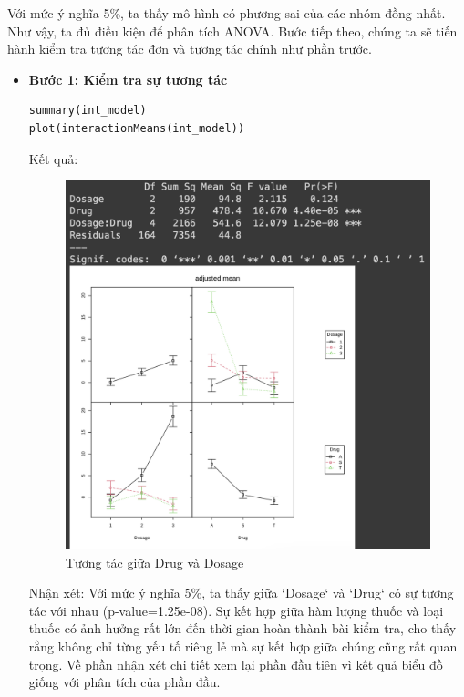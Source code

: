 Với mức ý nghĩa 5\%, ta thấy mô hình có phương sai của các nhóm đồng nhất. Như vậy, ta đủ điều kiện để phân tích ANOVA. Bước tiếp theo, chúng ta sẽ tiến hành kiểm tra tương tác đơn và tương tác chính như phần trước.

\begin{itemize}
    \item \textbf{Bước 1: Kiểm tra sự tương tác }
    \begin{lstlisting}
summary(int_model)
plot(interactionMeans(int_model))
    \end{lstlisting}

Kết quả:
\begin{figure}[H]
    \centering
    \includegraphics[width=0.7\linewidth]{part01_figures/24.png}
    \caption{Tương tác giữa Drug và Dosage}
    \label{fig:Tương tác giữa Drug và Dosage}
\end{figure}
Nhận xét: Với mức ý nghĩa 5\%, ta thấy giữa `Dosage` và `Drug` có sự tương tác với nhau (p-value=1.25e-08). Sự kết hợp giữa hàm lượng thuốc và loại thuốc có ảnh hưởng rất lớn đến thời gian hoàn thành bài kiểm tra, cho thấy rằng không chỉ từng yếu tố riêng lẻ mà sự kết hợp giữa chúng cũng rất quan trọng. Về phần nhận xét chi tiết xem lại phần đầu tiên vì kết quả biểu đồ giống với phân tích của phần đầu.


\end{itemize}
